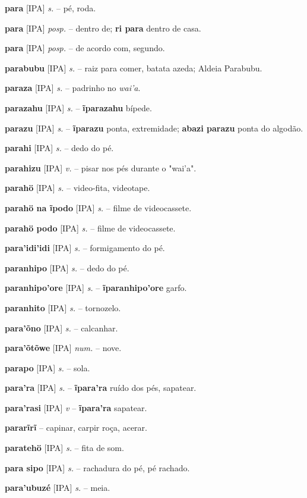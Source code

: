 \textbf{para} [IPA] \textit{s.} -- pé, roda.

\textbf{para} [IPA] \textit{posp.} -- dentro de; \textbf{ri para} dentro de casa.

\textbf{para} [IPA] \textit{posp.} -- de acordo com, segundo.

\textbf{parabubu} [IPA] \textit{s.} -- raiz para comer, batata azeda; Aldeia Parabubu.

\textbf{paraza} [IPA] \textit{s.} -- padrinho no \textit{wai'a}.

\textbf{parazahu} [IPA] \textit{s.} -- \textbf{ĩparazahu} bípede.

\textbf{parazu} [IPA] \textit{s.} -- \textbf{ĩparazu} ponta, extremidade; \textbf{abazi parazu} ponta do algodão.

\textbf{parahi} [IPA] \textit{s.} -- dedo do pé.

\textbf{parahizu} [IPA] \textit{v.} -- pisar nos pés durante o "wai'a".

\textbf{parahö} [IPA] \textit{s.} -- video-fita, videotape.

\textbf{parahö na ĩpodo} [IPA] \textit{s.} -- filme de videocassete.

\textbf{parahö podo} [IPA] \textit{s.} -- filme de videocassete.

\textbf{para'idi'idi} [IPA] \textit{s.} -- formigamento do pé.

\textbf{paranhipo} [IPA] \textit{s.} -- dedo do pé.

\textbf{paranhipo'ore} [IPA] \textit{s.} -- \textbf{ĩparanhipo'ore} garfo.

\textbf{paranhito} [IPA] \textit{s.} -- tornozelo.

\textbf{para'õno} [IPA] \textit{s.} -- calcanhar.

\textbf{para'õtõwe} [IPA] \textit{num.} -- nove.

\textbf{parapo} [IPA] \textit{s.} -- sola.

\textbf{para'ra} [IPA] \textit{s.} -- \textbf{ĩpara'ra} ruído dos pés, sapatear.

\textbf{para'rasi} [IPA] \textit{v} -- \textbf{ĩpara'ra} sapatear.

\textbf{pararĩrĩ} -- capinar, carpir roça, acerar.

\textbf{paratehö} [IPA] \textit{s.} -- fita de som.

\textbf{para sipo} [IPA] \textit{s.} -- rachadura do pé, pé rachado.

\textbf{para'ubuzé} [IPA] \textit{s.} -- meia.

